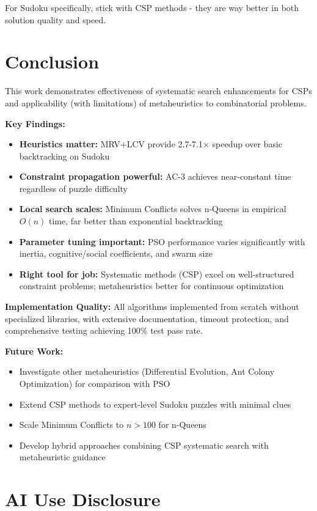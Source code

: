 \documentclass[letterpaper]{article}
\begin{document}
For Sudoku specifically, stick with CSP methods - they are way better in both solution quality and speed.

\section{Conclusion}

This work demonstrates effectiveness of systematic search enhancements for CSPs and applicability (with limitations) of metaheuristics to combinatorial problems.

\textbf{Key Findings:}
\begin{itemize}
\item \textbf{Heuristics matter:} MRV+LCV provide 2.7-7.1× speedup over basic backtracking on Sudoku
\item \textbf{Constraint propagation powerful:} AC-3 achieves near-constant time regardless of puzzle difficulty
\item \textbf{Local search scales:} Minimum Conflicts solves n-Queens in empirical $O(n)$ time, far better than exponential backtracking
\item \textbf{Parameter tuning important:} PSO performance varies significantly with inertia, cognitive/social coefficients, and swarm size
\item \textbf{Right tool for job:} Systematic methods (CSP) excel on well-structured constraint problems; metaheuristics better for continuous optimization
\end{itemize}

\textbf{Implementation Quality:}
All algorithms implemented from scratch without specialized libraries, with extensive documentation, timeout protection, and comprehensive testing achieving 100\% test pass rate.

\textbf{Future Work:}
\begin{itemize}
\item Investigate other metaheuristics (Differential Evolution, Ant Colony Optimization) for comparison with PSO
\item Extend CSP methods to expert-level Sudoku puzzles with minimal clues
\item Scale Minimum Conflicts to $n > 100$ for n-Queens
\item Develop hybrid approaches combining CSP systematic search with metaheuristic guidance
\end{itemize}

\section{AI Use Disclosure}
\end{document}
